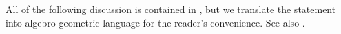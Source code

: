 \documentclass{article}
\newtheorem{proposition}[theorem]{Proposition}
\theoremstyle{definition}
\begin{document}
	All of the following discussion is contained in \cite[Theorem I.4.11]{malle}, but we translate the statement into algebro-geometric language for the reader's convenience. See also \cite[Chapter 8]{serre}. \par 
\end{document}
